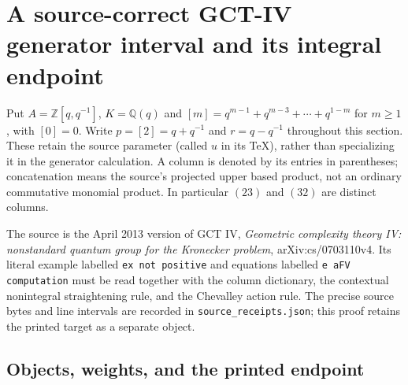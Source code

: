 \section{A source-correct GCT-IV generator interval and its integral endpoint}
\label{sec:gct-generator-interval}

Put $A=\mathbb Z[q,q^{-1}]$, $K=\mathbb Q(q)$ and
$[m]=q^{m-1}+q^{m-3}+\cdots+q^{1-m}$ for $m\geq1$, with $[0]=0$.
Write $p=[2]=q+q^{-1}$ and $r=q-q^{-1}$ throughout this section.
These retain the source parameter (called $u$ in its TeX), rather than
specializing it in the generator calculation. A column is denoted by
its entries in parentheses; concatenation means the source's projected
upper based product, not an ordinary commutative monomial product.
In particular $(23)$ and $(32)$ are distinct columns.

The source is the April 2013 version of GCT IV,
\emph{Geometric complexity theory IV: nonstandard quantum group for the
Kronecker problem}, arXiv:cs/0703110v4. Its literal example labelled
\texttt{ex not positive} and equations labelled \texttt{e aFV computation}
must be read together with the column dictionary, the contextual
nonintegral straightening rule, and the Chevalley action rule. The
precise source bytes and line intervals are recorded in
\texttt{source\_receipts.json}; this proof retains the printed target
as a separate object.

\subsection{Objects, weights, and the printed endpoint}

